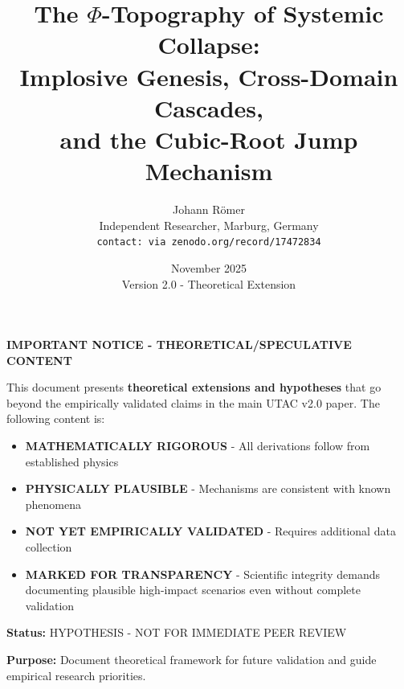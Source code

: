 \documentclass[11pt,a4paper]{article}
\title{\textbf{The $\Phi$-Topography of Systemic Collapse: \\
Implosive Genesis, Cross-Domain Cascades, \\
and the Cubic-Root Jump Mechanism}}
\author{
Johann Römer\\
\small Independent Researcher, Marburg, Germany\\
\small \texttt{contact: via zenodo.org/record/17472834}
}
\date{November 2025 \\ Version 2.0 - Theoretical Extension}
\begin{document}
\maketitle

\begin{shaded}
\textbf{IMPORTANT NOTICE - THEORETICAL/SPECULATIVE CONTENT}

This document presents \textbf{theoretical extensions and hypotheses} that go beyond the empirically validated claims in the main UTAC v2.0 paper. The following content is:

\begin{itemize}
\item \textbf{MATHEMATICALLY RIGOROUS} - All derivations follow from established physics
\item \textbf{PHYSICALLY PLAUSIBLE} - Mechanisms are consistent with known phenomena
\item \textbf{NOT YET EMPIRICALLY VALIDATED} - Requires additional data collection
\item \textbf{MARKED FOR TRANSPARENCY} - Scientific integrity demands documenting plausible high-impact scenarios even without complete validation
\end{itemize}

\textbf{Status:} HYPOTHESIS - NOT FOR IMMEDIATE PEER REVIEW

\textbf{Purpose:} Document theoretical framework for future validation and guide empirical research priorities.
\end{shaded}
\end{document}
